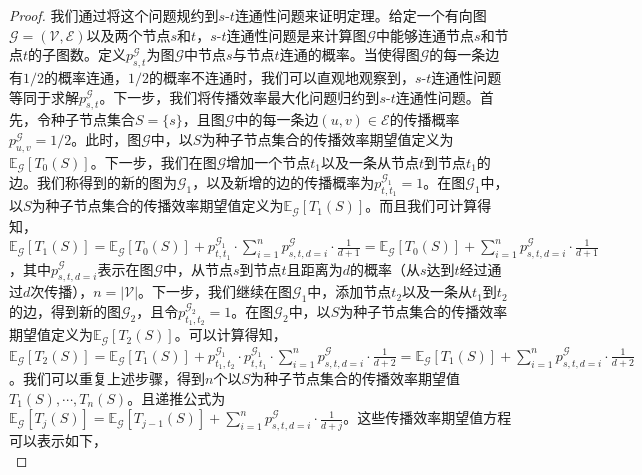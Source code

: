 \begin{proof}
我们通过将这个问题规约到$s$-$t$连通性问题来证明定理。给定一个有向图$\mathcal{G}=\left( \mathcal{V}, \mathcal{E} \right)$以及两个节点$s$和$t$，$s$-$t$连通性问题是来计算图$\mathcal{G}$中能够连通节点$s$和节点$t$的子图数。定义$p^\mathcal{G}_{s,t}$为图$\mathcal{G}$中节点$s$与节点$t$连通的概率。当使得图$\mathcal{G}$的每一条边有$1/2$的概率连通，$1/2$的概率不连通时，我们可以直观地观察到，$s$-$t$连通性问题等同于求解$p^\mathcal{G}_{s,t}$。下一步，我们将传播效率最大化问题归约到$s$-$t$连通性问题。首先，令种子节点集合$S=\{s\}$，且图$\mathcal{G}$中的每一条边$\left(u,v\right) \in \mathcal{E}$的传播概率$p^\mathcal{G}_{u,v}=1/2$。此时，图$\mathcal{G}$中，以$S$为种子节点集合的传播效率期望值定义为$\mathbb{E}_\mathcal{G}\left[T_0\left(S\right)\right]$。下一步，我们在图$\mathcal{G}$增加一个节点$t_1$以及一条从节点$t$到节点$t_1$的边。我们称得到的新的图为$\mathcal{G}_1$，以及新增的边的传播概率为$p^{\mathcal{G}_1}_{t,t_1}=1$。在图$\mathcal{G}_1$中，以$S$为种子节点集合的传播效率期望值定义为$\mathbb{E}_\mathcal{G}\left[T_1\left(S\right)\right]$。而且我们可计算得知，$\mathbb{E}_\mathcal{G}\left[T_1\left(S\right)\right]=\mathbb{E}_\mathcal{G} \left[T_0\left(S\right)\right] + p^{\mathcal{G}_1}_{t,t_1}\cdot \sum_{i=1}^n{p^\mathcal{G}_{s,t,d=i}\cdot \frac{1}{d+1}}=\mathbb{E}_\mathcal{G} \left[T_0\left(S\right) \right] + \sum_{i=1}^n{p^\mathcal{G}_{s,t,d=i}\cdot \frac{1}{d+1}}$，其中$p^\mathcal{G}_{s,t,d=i}$表示在图$\mathcal{G}$中，从节点$s$到节点$t$且距离为$d$的概率（从$s$达到$t$经过通过$d$次传播），$n=\left\vert\mathcal{V}\right\vert$。下一步，我们继续在图$\mathcal{G}_1$中，添加节点$t_2$以及一条从$t_1$到$t_2$的边，得到新的图$\mathcal{G}_2$，且令$p^{\mathcal{G}_2}_{t_1,t_2}=1$。在图$\mathcal{G}_2$中，以$S$为种子节点集合的传播效率期望值定义为$\mathbb{E}_\mathcal{G}\left[T_2\left(S\right)\right]$。可以计算得知，$\mathbb{E}_\mathcal{G}\left[T_2\left(S\right)\right]=\mathbb{E}_\mathcal{G} \left[T_1\left(S\right)\right] + p^{\mathcal{G}_1}_{t_1,t_2}\cdot p^{\mathcal{G}_1}_{t,t_1}\cdot \sum_{i=1}^n{p^\mathcal{G}_{s,t,d=i}\cdot \frac{1}{d+2}}=\mathbb{E}_\mathcal{G} \left[T_1\left(S\right)\right] + \sum_{i=1}^n{p^\mathcal{G}_{s,t,d=i}\cdot \frac{1}{d+2}}$。我们可以重复上述步骤，得到$n$个以$S$为种子节点集合的传播效率期望值$T_1\left(S\right),\cdots,T_n\left(S\right)$。且递推公式为$\mathbb{E}_\mathcal{G}\left[T_j\left(S\right)\right]=\mathbb{E}_\mathcal{G} \left[T_{j-1}\left(S\right)\right] + \sum_{i=1}^n{p^\mathcal{G}_{s,t,d=i}\cdot \frac{1}{d+j}}$。这些传播效率期望值方程可以表示如下，
\begin{equation}\label{eq:sharpHard}

\end{equation}
\end{proof}
